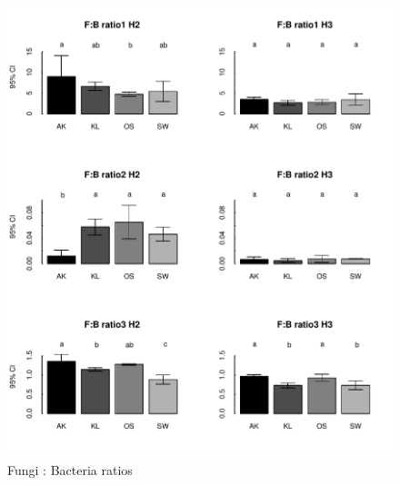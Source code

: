 \documentclass[journal abbreviation]{copernicus}
\begin{document}
\begin{figure}[t]
\vspace*{2mm}
\begin{center}
\includegraphics[width=12cm]{plfa.pdf}
\end{center}
\label{plfa}
\caption{Fungi : Bacteria ratios}
\end{figure}




%
%



%
%
\end{document}
